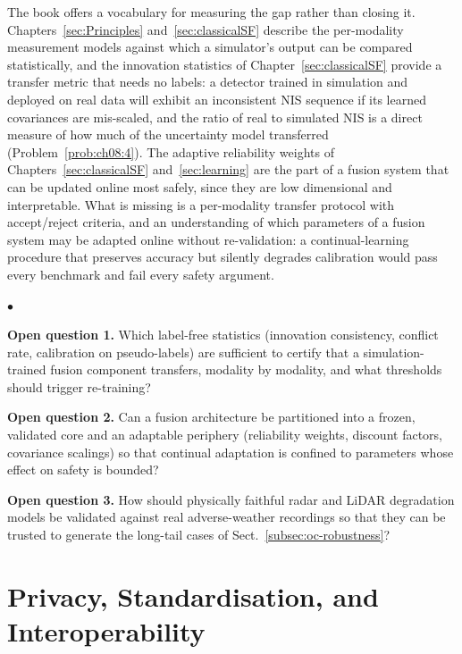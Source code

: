 \documentclass[graybox,envcountchap]{style/SNmono}
\newenvironment{list4a}{
  \begin{list}{$\bullet$}{
      \setlength{\itemsep}{0.05cm}
      \setlength{\labelsep}{0.2cm}
      \setlength{\labelwidth}{0.3cm}
      \setlength{\parsep}{0in}
      \setlength{\parskip}{0in}
      \setlength{\topsep}{0in}
      \setlength{\partopsep}{0in}
      \setlength{\leftmargin}{0.16in}}}
      {\end{list}}
\begin{document}
The book offers a vocabulary for measuring the gap rather than closing it. Chapters~\ref{sec:Principles} and~\ref{sec:classicalSF} describe the per-modality measurement models against which a simulator's output can be compared statistically, and the innovation statistics of Chapter~\ref{sec:classicalSF} provide a transfer metric that needs no labels: a detector trained in simulation and deployed on real data will exhibit an inconsistent NIS sequence if its learned covariances are mis-scaled, and the ratio of real to simulated NIS is a direct measure of how much of the uncertainty model transferred (Problem~\ref{prob:ch08:4}). The adaptive reliability weights of Chapters~\ref{sec:classicalSF} and~\ref{sec:learning} are the part of a fusion system that can be updated online most safely, since they are low dimensional and interpretable. What is missing is a per-modality transfer protocol with accept/reject criteria, and an understanding of which parameters of a fusion system may be adapted online without re-validation: a continual-learning procedure that preserves accuracy but silently degrades calibration would pass every benchmark and fail every safety argument.

\begin{list4a}
    \item \textbf{Open question 1.} Which label-free statistics (innovation consistency, conflict rate, calibration on pseudo-labels) are sufficient to certify that a simulation-trained fusion component transfers, modality by modality, and what thresholds should trigger re-training?
    \item \textbf{Open question 2.} Can a fusion architecture be partitioned into a frozen, validated core and an adaptable periphery (reliability weights, discount factors, covariance scalings) so that continual adaptation is confined to parameters whose effect on safety is bounded?
    \item \textbf{Open question 3.} How should physically faithful radar and LiDAR degradation models be validated against real adverse-weather recordings so that they can be trusted to generate the long-tail cases of Sect.~\ref{subsec:oc-robustness}?
\end{list4a}

\section{Privacy, Standardisation, and Interoperability}
\label{subsec:oc-privacy}
\end{document}
